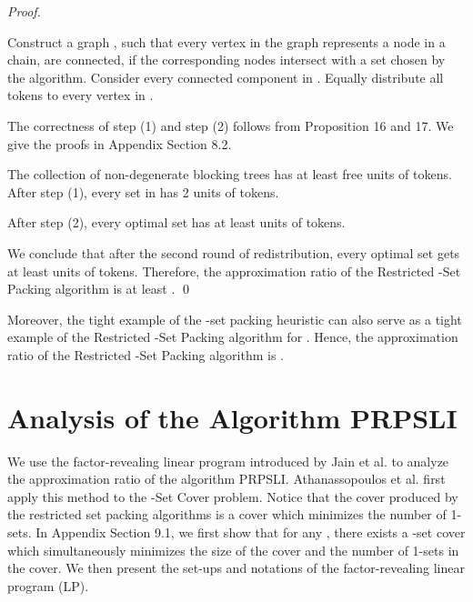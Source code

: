 \documentclass[runningheads,a4paper]{llncs}
\numberwithin{equation}{section}
\begin{document}
\begin{proof}
\begin{itemize}
        Construct a graph , such that every vertex in the graph represents a node in a chain,  are connected, if the corresponding nodes intersect with a set  chosen by the algorithm. Consider every connected component  in . Equally distribute all tokens to every vertex in .







    \end{itemize}


The correctness of step (1) and step (2) follows from Proposition 16 and 17. We give the proofs in Appendix Section 8.2.
\begin{proposition}
The collection of non-degenerate blocking trees has at least  free units of tokens. After step (1), every set in  has 2 units of tokens.
\end{proposition}

\begin{proposition}
After step (2), every optimal set has at least  units of tokens.
\end{proposition}

We conclude that after the second round of redistribution, every optimal set gets at least  units of tokens. Therefore, the approximation ratio of the Restricted -Set Packing algorithm is at least . \qed
\end{proof}

Moreover, the tight example of the -set packing heuristic \cite{schrijver} can also serve as a tight example of the Restricted -Set Packing algorithm for . Hence, the approximation ratio of the Restricted -Set Packing algorithm is . \\




\section{Analysis of the Algorithm PRPSLI}

We use the factor-revealing linear program introduced by Jain et al. \cite{lp1} to analyze the approximation ratio of the algorithm PRPSLI. Athanassopoulos et al. \cite{lp} first apply this method to the -Set Cover problem. Notice that the cover produced by the restricted set packing algorithms is a cover which minimizes the number of 1-sets. In Appendix Section 9.1, we first show that for any , there exists a -set cover which simultaneously minimizes the size of the cover and the number of 1-sets in the cover. We then present the set-ups and notations of the factor-revealing linear program (LP).
\end{document}
